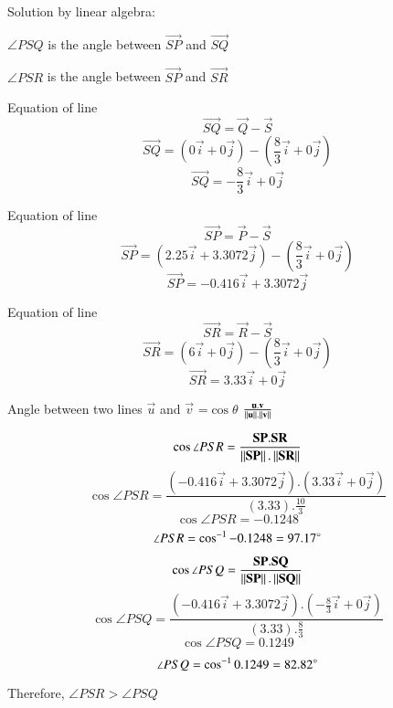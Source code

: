 Solution by linear algebra:

$\angle{PSQ}$ is the angle between $\vec{SP}$ and $\vec{SQ}$

$\angle{PSR}$ is the angle between $\vec{SP}$ and $\vec{SR}$

Equation of line $$\vec{SQ} = \vec{Q}-\vec{S}$$
$$\vec{SQ} = (0\vec{i}+0\vec{j}) - (\frac{8}{3}\vec{i}+0\vec{j})$$
$$\vec{SQ} = -\frac{8}{3}\vec{i}+0\vec{j}$$

Equation of line $$\vec{SP} = \vec{P}-\vec{S}$$
$$\vec{SP} = (2.25\vec{i}+3.3072\vec{j}) - (\frac{8}{3}\vec{i}+0\vec{j})$$
$$\vec{SP} = -0.416\vec{i}+3.3072\vec{j}$$

Equation of line $$\vec{SR} = \vec{R}-\vec{S}$$
$$\vec{SR} = (6\vec{i}+0\vec{j}) - (\frac{8}{3}\vec{i}+0\vec{j})$$
$$\vec{SR} = 3.33\vec{i}+0\vec{j}$$

Angle between two lines $\vec{u}$ and $\vec{v}$ =$\cos{\theta}$ $\frac{\mathbf{u}.\mathbf{v}}{\left\lVert\mathbf{u}\right\rVert.\left\lVert\mathbf{v}\right\rVert}$

$$\cos{\angle{PSR}} = \frac{\mathbf{SP}.\mathbf{SR}}{\left\lVert\mathbf{SP}\right\rVert.\left\lVert\mathbf{SR}\right\rVert}$$
$$\cos{\angle{PSR}} = \frac{(-0.416\vec{i}+3.3072\vec{j}).(3.33\vec{i}+0\vec{j})}{(3.33).\frac{10}{3}}$$
$$\cos{\angle{PSR}} = -0.1248$$
$$\angle{PSR} = \cos^{-1}{-0.1248} = 97.17\degree$$

$$\cos{\angle{PSQ}} = \frac{\mathbf{SP}.\mathbf{SQ}}{\left\lVert\mathbf{SP}\right\rVert.\left\lVert\mathbf{SQ}\right\rVert}$$
$$\cos{\angle{PSQ}} = \frac{(-0.416\vec{i}+3.3072\vec{j}).(-\frac{8}{3}\vec{i}+0\vec{j})}{(3.33).\frac{8}{3}}$$
$$\cos{\angle{PSQ}} = 0.1249$$
$$\angle{PSQ} = \cos^{-1}{0.1249} = 82.82\degree$$

Therefore, $\angle{PSR}>\angle{PSQ}$